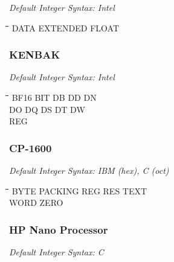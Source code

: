 {\em Default Integer Syntax: Intel}

{\tt\begin{tabbing}
\hspace{3cm}\=\hspace{3cm}\=\hspace{3cm}\=\hspace{3cm}\=\kill
DATA       \> EXTENDED    \> FLOAT \\
\end{tabbing}}

\subsubsection{KENBAK}

{\em Default Integer Syntax: Intel}

{\tt\begin{tabbing}
\hspace{3cm}\=\hspace{3cm}\=\hspace{3cm}\=\hspace{3cm}\=\kill
BF16       \> BIT         \> DB          \> DD          \> DN \\
DO         \> DQ          \> DS          \> DT          \> DW \\
REG \\
\end{tabbing}}

\subsubsection{CP-1600}

{\em Default Integer Syntax: IBM (hex), C (oct) }

{\tt\begin{tabbing}
\hspace{3cm}\=\hspace{3cm}\=\hspace{3cm}\=\hspace{3cm}\=\kill
BYTE       \> PACKING     \> REG         \> RES         \> TEXT \\
WORD       \> ZERO \\
\end{tabbing}}

\subsubsection{HP Nano Processor}

{\em Default Integer Syntax: C }

